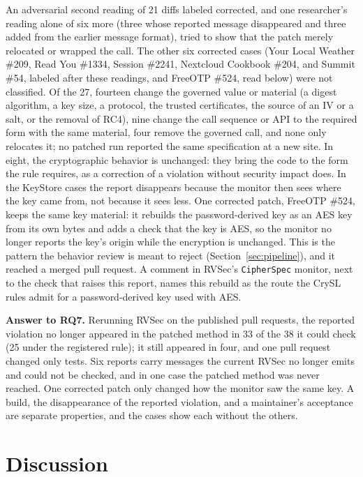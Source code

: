 \documentclass[conference]{IEEEtran}
\newcommand{\researchq}[1]{\textbf{RQ#1}}
\begin{document}
An adversarial second reading of 21 diffs labeled corrected, and one
researcher's reading alone of six more (three whose reported message
disappeared and three added from the earlier message format), tried to show
that the patch merely relocated or wrapped the call. The other six corrected
cases (Your Local Weather \#209, Read You \#1334, Session \#2241, Nextcloud
Cookbook \#204, and Summit \#54, labeled after these readings, and FreeOTP
\#524, read below) were not classified. Of the 27, fourteen change the
governed value or material (a digest algorithm, a key size, a protocol, the trusted
certificates, the source of an IV or a salt, or the removal of RC4), nine change the call sequence or API to the
required form with the same material, four remove the governed call, and none
only relocates it; no patched run reported the same specification at a new
site. In eight, the cryptographic behavior is unchanged: they bring the code to
the form the rule requires, as a correction of a violation without security
impact does. In the KeyStore cases the report disappears because the monitor
then sees where the key came from, not because it sees less. One corrected
patch, FreeOTP \#524, keeps the same key material: it rebuilds the
password-derived key as an AES key from its own bytes and adds a check that
the key is AES, so the monitor no longer reports the key's origin while the
encryption is unchanged. This is the pattern the behavior review is meant to
reject (Section~\ref{sec:pipeline}), and it reached a merged pull request.
A comment in RVSec's \texttt{CipherSpec} monitor, next to the check that
raises this report, names this rebuild as the route the CrySL rules admit for a
password-derived key used with AES.

\textbf{Answer to \researchq{7}.} Rerunning RVSec on the published pull
requests, the reported violation no longer appeared in the patched method in
33 of the 38 it could check (25 under the registered rule); it still appeared
in four, and one pull request
changed only tests. Six reports carry messages the current RVSec no longer
emits and could not be checked, and in one case the patched method was never
reached. One corrected patch only changed how the monitor saw the same key. A build, the disappearance of the reported violation, and a
maintainer's acceptance are separate properties, and the cases show each
without the others.

\section{Discussion}
\label{sec:discussion}
\end{document}
